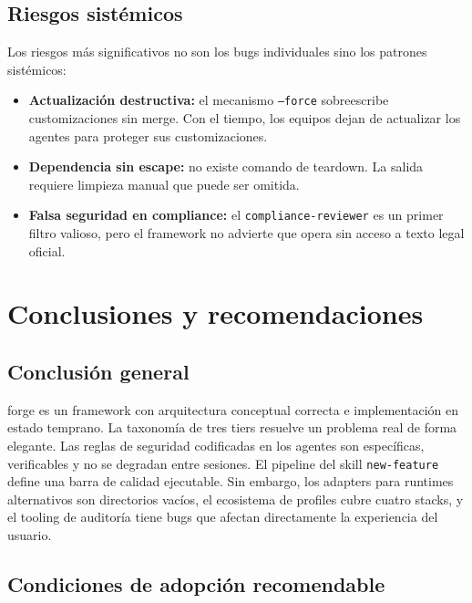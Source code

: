 \documentclass[12pt,a4paper]{article}
\begin{document}
\subsection{Riesgos sistémicos}

Los riesgos más significativos no son los bugs individuales sino los patrones sistémicos:

\begin{itemize}
  \item \textbf{Actualización destructiva:} el mecanismo \texttt{--force} sobreescribe
        customizaciones sin merge. Con el tiempo, los equipos dejan de actualizar los
        agentes para proteger sus customizaciones.
  \item \textbf{Dependencia sin escape:} no existe comando de teardown. La salida
        requiere limpieza manual que puede ser omitida.
  \item \textbf{Falsa seguridad en compliance:} el \texttt{compliance-reviewer} es
        un primer filtro valioso, pero el framework no advierte que opera sin acceso
        a texto legal oficial.
\end{itemize}

\section{Conclusiones y recomendaciones}

\subsection{Conclusión general}

forge es un framework con arquitectura conceptual correcta e implementación en estado
temprano. La taxonomía de tres tiers resuelve un problema real de forma elegante.
Las reglas de seguridad codificadas en los agentes son específicas, verificables y
no se degradan entre sesiones. El pipeline del skill \texttt{new-feature} define una
barra de calidad ejecutable. Sin embargo, los adapters para runtimes alternativos son
directorios vacíos, el ecosistema de profiles cubre cuatro stacks, y el tooling de
auditoría tiene bugs que afectan directamente la experiencia del usuario.

\subsection{Condiciones de adopción recomendable}
\end{document}
